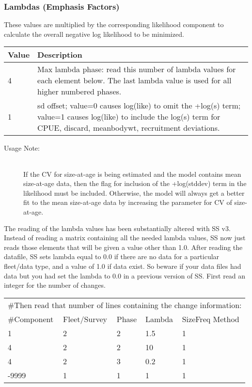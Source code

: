 \subsubsection{Lambdas (Emphasis Factors)}
These values are multiplied by the corresponding likelihood component to calculate the overall negative log likelihood to be minimized.

\begin{center}
	\begin{tabular}{p{2cm} p{14cm}}
		Value & Description \\
		\hline
		4 & Max lambda phase: read this number of lambda values for each element below.  The last lambda value is used for all higher numbered phases.\\
		1 & sd offset; value=0 causes log(like) to omit the +log(s) term; value=1 causes log(like) to include the log(s) term for CPUE, discard, meanbodywt, recruitment deviations. \\
		\hline
	\end{tabular}
\end{center}

\begin{description}
	\item[Usage Note:]\hfil\\
	If the CV for size-at-age is being estimated and the model contains mean size-at-age data, then the flag for inclusion of the +log(stddev) term in the likelihood must be included.  Otherwise, the model will always get a better fit to the mean size-at-age data by increasing the parameter for CV of size-at-age.
\end{description}

The reading of the lambda values has been substantially altered with SS v3.  Instead of reading a matrix containing all the needed lambda values, SS now just reads those elements that will be given a value other than 1.0.  After reading the datafile, SS sets lambda equal to 0.0 if there are no data for a particular fleet/data type, and a value of 1.0 if data exist.  So beware if your data files had data but you had set the lambda to 0.0 in a previous version of SS.  First read an integer for the number of changes.

\begin{center}
	\begin{longtable}{p{3cm} p{3cm} p{2cm} p{3cm} p{3cm}}
		\hline
		\multicolumn{5}{l}{\#Then read that number of lines containing the change information:}\\
		\#Component & Fleet/Survey & Phase & Lambda & SizeFreq Method \\
		\hline
		1 & 2 & 2 & 1.5 & 1 \\
		4 & 2 & 2 & 10 & 1 \\
		4 & 2 & 3 & 0.2 & 1 \\
		-9999 & 1 & 1 & 1 & 1 \\
		\hline
	\end{longtable}
\end{center}

